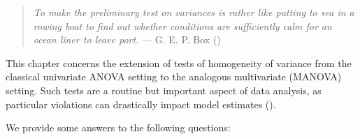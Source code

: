 \documentclass[
  letterpaper,
  10pt,
  krantz2]{krantz}
\begin{document}
\renewcommand*{\vec}[1]{\mathbf{#1}}
\newcommand{\trans}{^\mathsf{T}}
\newcommand*{\mat}[1]{\mathbf{#1}}
\newcommand*{\diag}[1]{\mathrm{diag}\, #1}

\renewcommand*{\det}[1]{\mathrm{det}(#1)}
\newcommand*{\rank}[1]{\mathrm{rank} (\mathbf{#1})}
\newcommand*{\trace}[1]{\mathrm{tr} (\mathbf{#1})}
\newcommand*{\dev}[1]{(#1 - \bar{#1})}
\newcommand*{\inv}[1]{\mat{#1}^{-1}}
\newcommand*{\half}[1]{\mat{#1}^{1/2}}
\newcommand*{\invhalf}[1]{\mat{#1}^{-1/2}}
\newcommand*{\nvec}[2]{{#1}_{1}, {#1}_{2},\ldots,{#1}_{#2}}
\newcommand*{\Beta}{\boldsymbol{B}}
\newcommand*{\Epsilon}{\boldsymbol{\Large\varepsilon}}
\newcommand*{\period}{\:\: .}
\newcommand*{\comma}{\:\: ,}
\newcommand*{\given}{\, | \,}
\newcommand*{\Real}[1]{\mathbb{R}^{#1}}
\newcommand*{\degree}[1]{{#1}^{\circ}}

\newcommand{\sizedmat}[2]{\mathord{\mathop{\mat{#1}}\limits_{#2}}}

\renewcommand*{\H}{\mathbf{H}}               
\newcommand*{\E}{\mathbf{E}}
\newcommand*{\widebar}[1]{\overline{#1}}

\newcommand{\Var}{\mathsf{Var}}
\newcommand{\Cov}{\mathsf{Cov}}
\newcommand{\HO}{\mathcal{H}_0}

\newcommand*{\V}{\mathcal{V}}

\newcommand{\pkg}[1]{\textsf{#1}}
\newcommand{\Rpackage}[1]{\pkg{#1} package}

\begin{quote}
\emph{To make the preliminary test on variances is rather like putting
to sea in a rowing boat to find out whether conditions are sufficiently
calm for an ocean liner to leave port.} --- G. E. P. Box
()
\end{quote}

This chapter concerns the extension of tests of homogeneity of variance
from the classical univariate ANOVA setting to the analogous
multivariate (MANOVA) setting. Such tests are a routine but important
aspect of data analysis, as particular violations can drastically impact
model estimates ().

We provide some answers to the following questions:
\end{document}

